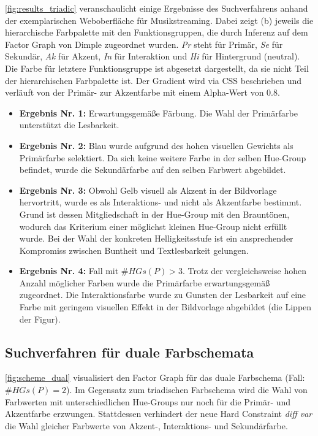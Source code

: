 \autoref{fig:results_triadic} veranschaulicht einige Ergebnisse des Suchverfahrens anhand der exemplarischen Weboberfläche für Musikstreaming. Dabei zeigt (b) jeweils die hierarchische Farbpalette mit den Funktionsgruppen, die durch Inferenz auf dem Factor Graph von Dimple zugeordnet wurden. \emph{Pr} steht für Primär, \emph{Se} für Sekundär, \emph{Ak} für Akzent, \emph{In} für Interaktion und \emph{Hi} für Hintergrund (neutral). Die Farbe für letztere Funktionsgruppe ist abgesetzt dargestellt, da sie nicht Teil der hierarchischen Farbpalette ist. Der Gradient wird via CSS beschrieben und verläuft von der Primär- zur Akzentfarbe mit einem Alpha-Wert von 0.8.

\begin{itemize}
	\item \textbf{Ergebnis Nr. 1:} Erwartungsgemäße Färbung. Die Wahl der Primärfarbe unterstützt die Lesbarkeit.
	\item \textbf{Ergebnis Nr. 2:} Blau wurde aufgrund des hohen visuellen Gewichts als Primärfarbe selektiert. Da sich keine weitere Farbe in der selben Hue-Group befindet, wurde die Sekundärfarbe auf den selben Farbwert abgebildet.
	 \item \textbf{Ergebnis Nr. 3:} Obwohl Gelb visuell als Akzent in der Bildvorlage hervortritt, wurde es als Interaktions- und nicht als Akzentfarbe bestimmt. Grund ist dessen Mitgliedschaft in der Hue-Group mit den Brauntönen, wodurch das Kriterium einer möglichst kleinen Hue-Group nicht erfüllt wurde. Bei der Wahl der konkreten Helligkeitsstufe ist ein ansprechender Kompromiss zwischen Buntheit und Textlesbarkeit gelungen.
	 \item \textbf{Ergebnis Nr. 4:} Fall mit $\#HGs(P) > 3$. Trotz der vergleichsweise hohen Anzahl möglicher Farben wurde die Primärfarbe erwartungsgemäß zugeordnet. Die Interaktionsfarbe wurde zu Gunsten der Lesbarkeit auf eine Farbe mit geringem visuellen Effekt in der Bildvorlage abgebildet (die Lippen der Figur).
\end{itemize}

\subsection{Suchverfahren für duale Farbschemata}

\autoref{fig:scheme_dual} visualisiert den Factor Graph für das duale Farbschema (Fall: $\#HGs(P) = 2$). Im Gegensatz zum triadischen Farbschema wird die Wahl von Farbwerten mit unterschiedlichen Hue-Groups nur noch für die Primär- und Akzentfarbe erzwungen. Stattdessen verhindert der neue Hard Constraint \emph{diff var} die Wahl gleicher Farbwerte von Akzent-, Interaktions- und Sekundärfarbe.

